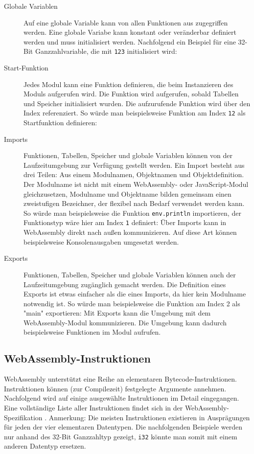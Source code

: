 \begin{description}
    \item[Globale Variablen] Auf eine globale Variable kann von allen Funktionen aus zugegriffen werden. Eine globale Variabe kann konstant oder veränderbar definiert werden und muss initialisiert werden. Nachfolgend ein Beispiel für eine 32-Bit Ganzzahlvariable, die mit \lstinline{123} initialisiert wird: 
    \item[Start-Funktion] Jedes Modul kann eine Funktion definieren, die beim Instanzieren des Moduls aufgerufen wird. Die Funktion wird aufgerufen, sobald Tabellen und Speicher initialisiert wurden. Die aufzurufende Funktion wird über den Index referenziert. So würde man beispielsweise Funktion am Index \lstinline{12} als Startfunktion definieren: 
    \item[Imports] Funktionen, Tabellen, Speicher und globale Variablen können von der Laufzeitumgebung zur Verfügung gestellt werden. Ein Import besteht aus drei Teilen: Aus einem Modulnamen, Objektnamen und Objektdefinition. Der Modulname ist nicht mit einem WebAssembly- oder JavaScript-Modul gleichzusetzen, Modulname und Objektname bilden gemeinsam einen zweistufigen Bezeichner, der flexibel nach Bedarf verwendet werden kann. So würde man beispielsweise die Funktion \lstinline{env.println} importieren, der Funktionstyp wäre hier am Index \lstinline{1} definiert: 
    Über Imports kann in WebAssembly direkt nach außen kommunizieren. Auf diese Art können beispielsweise Konsolenausgaben umgesetzt werden.
    \item[Exports] Funktionen, Tabellen, Speicher und globale Variablen können auch der Laufzeitumgebung zugänglich gemacht werden. Die Definition eines Exports ist etwas einfacher als die eines Imports, da hier kein Modulname notwendig ist. So würde man beispielsweise die Funktion am Index 2 als "main" exportieren: 
    Mit Exports kann die Umgebung mit dem WebAssembly-Modul kommunizieren. Die Umgebung kann dadurch beispielsweise Funktionen im Modul aufrufen.
\end{description}

\subsection{WebAssembly-Instruktionen}
\label{subsec:WebAssembly-Instruktionen}
WebAssembly unterstützt eine Reihe an elementaren Bytecode-Instruktionen. Instruktionen können (zur Compilezeit) festgelegte Argumente annehmen. Nachfolgend wird auf einige ausgewählte Instruktionen im Detail eingegangen. Eine vollständige Liste aller Instruktionen findet sich in der WebAssembly-Spezifikation \cite{WebAssemblySpecification}. Anmerkung: Die meisten Instruktionen existieren in Ausprägungen für jeden der vier elementaren Datentypen. Die nachfolgenden Beispiele werden nur anhand des 32-Bit Ganzzahltyp gezeigt, \lstinline{i32} könnte man somit mit einem anderen Datentyp ersetzen.

